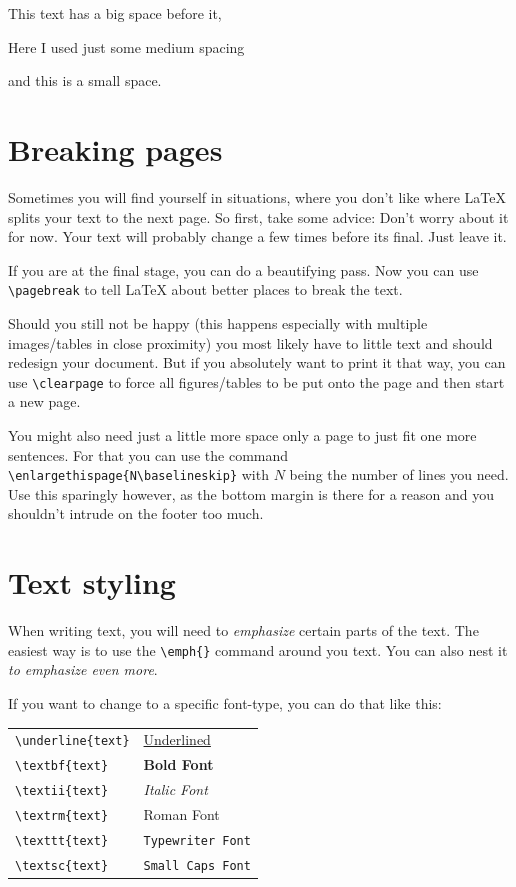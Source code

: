 \documentclass[	%
		fontsize=11pt,  %
		a4paper,	    %
		english,		%
		sans,			%
		f1,				%
	]{HsH-report}		%
\begin{document}
		\bigskip
		This text has a big space before it,

		\medskip
		Here I used just some medium spacing

		\smallskip
		and this is a small space.

	\section{Breaking pages} \label{sec: pagebreak}
		Sometimes you will find yourself in situations, where you don't like where LaTeX splits your text to the next page. So first, take some
		advice: Don't worry about it for now. Your text will probably change a few times before its final. Just leave it.

		If you are at the final stage, you can do a beautifying pass. Now you can use \lstinline|\pagebreak| to tell LaTeX about better places to
		break the text.

		Should you still not be happy (this happens especially with multiple images/tables in close proximity) you most likely have to little text and
		should redesign your document. But if you absolutely want to print it that way, you can use \lstinline|\clearpage| to force all
		figures/tables to be put onto the page and then start a new page.

		\medskip
		You might also need just a little more space only a page to just fit one more sentences. For that you can use the command
		\lstinline|\enlargethispage{N\baselineskip}| with $N$ being the number of lines you need. Use this sparingly however, as the bottom margin is
		there for a reason and you shouldn't intrude on the footer too much.

	\section{Text styling} \label{sec: styling}
		When writing text, you will need to \emph{emphasize} certain parts of the text. The easiest way is to use the \lstinline|\emph{}| command
		around you text. You can also nest it \emph{to \emph{emphasize} even more}.

		If you want to change to a specific font-type, you can do that like this:

		\smallskip
		\begin{tabular}{l l}
			\lstinline|\underline{text}| & \underline{Underlined} \\
			\lstinline|\textbf{text}| & \textbf{Bold Font} \\
			\lstinline|\textii{text}| & \textit{Italic Font} \\
			\lstinline|\textrm{text}| & \textrm{Roman Font} \\
			\lstinline|\texttt{text}| & \texttt{Typewriter Font} \\
			\lstinline|\textsc{text}| & \texttt{Small Caps Font} \\
		\end{tabular}
\end{document}
